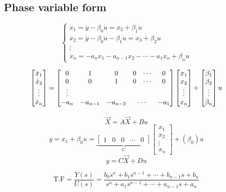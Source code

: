 \documentclass[11pt,a4paper]{article}
\begin{document}
\subsection{Phase variable form}

\[
\left\{\begin{array}{l}
\dot{x}_1=\dot{y}-\beta_0\dot{u}=x_2+\beta_1u\\
\dot{x}_2=\ddot{y}-\beta_0\ddot{u}-\beta_1\dot{u}=x_3+\beta_2u\\
\vdots\\
\dot{x}_n=-a_nx_1-a_{n-1}x_2-\cdots-a_1x_n+\beta_nu
\end{array}\right.
\]

\[
\begin{bmatrix}\dot{x}_1\\\dot{x}_2\\\vdots\\\dot{x}_n\end{bmatrix}
=
\begin{bmatrix}
0&1&0&0&\cdots&0\\
0&0&1&0&\cdots&0\\
\vdots\\
-a_n&-a_{n-1}&-a_{n-2}&\multicolumn{2}{c}{\cdots}&-a_1
\end{bmatrix}
\begin{bmatrix}x_1\\x_2\\\vdots\\x_n\end{bmatrix}
+
\begin{bmatrix}\beta_1\\\beta_2\\\vdots\\\beta_n\end{bmatrix}u
\]

\[
\dot{\vec{X}}=A\vec{X}+Bu
\]
\[
y=x_1+\beta_0u=\underbrace{\begin{bmatrix}1&0&0&\cdots&0\end{bmatrix}}_{C}\begin{bmatrix}x_1\\x_2\\\vdots\\x_n\end{bmatrix}+(\beta_0)u
\]
\[
y=C\vec{X}+Du
\]

\[
\text{T.F}=\frac{Y(s)}{U(s)}=\frac{b_0s^n+b_1s^{n-1}+\cdots+b_{n-1}s+b_n}{s^n+a_1s^{n-1}+\cdots+a_{n-1}s+a_n}
\]
\end{document}
